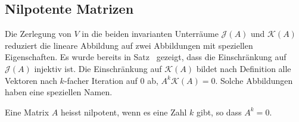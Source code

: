 %
%
\subsection{Nilpotente Matrizen
\label{buch:subsection:nilpotente-matrizen}}
Die Zerlegung von $V$ in die beiden invarianten Unterräume $\mathcal{J}(A)$
und $\mathcal{K}(A)$ reduziert die lineare Abbildung auf zwei Abbildungen
mit speziellen Eigenschaften.
Es wurde bereits in Satz~\label{buch:eigenwerte:satz:fJinj} gezeigt,
dass die Einschränkung auf $\mathcal{J}(A)$ injektiv ist.
Die Einschränkung auf $\mathcal{K}(A)$ bildet nach Definition alle
Vektoren nach $k$-facher Iteration auf $0$ ab, $A^k\mathcal{K}(A)=0$.
Solche Abbildungen haben eine speziellen Namen.

\begin{definition}
\label{buch:eigenwerte:def:nilpotent}
Eine Matrix $A$ heisst nilpotent, wenn es eine Zahl $k$ gibt, so dass
$A^k=0$.
\end{definition}

